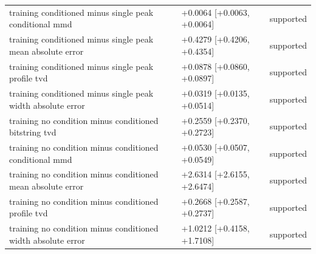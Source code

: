 \begin{table}[p]
\begin{tabular}{@{}p{}p{}p{}@{}}
training conditioned minus single peak conditional mmd & +0.0064 [+0.0063, +0.0064] & supported \\
training conditioned minus single peak mean absolute error & +0.4279 [+0.4206, +0.4354] & supported \\
training conditioned minus single peak profile tvd & +0.0878 [+0.0860, +0.0897] & supported \\
training conditioned minus single peak width absolute error & +0.0319 [+0.0135, +0.0514] & supported \\
training no condition minus conditioned bitstring tvd & +0.2559 [+0.2370, +0.2723] & supported \\
training no condition minus conditioned conditional mmd & +0.0530 [+0.0507, +0.0549] & supported \\
training no condition minus conditioned mean absolute error & +2.6314 [+2.6155, +2.6474] & supported \\
training no condition minus conditioned profile tvd & +0.2668 [+0.2587, +0.2737] & supported \\
training no condition minus conditioned width absolute error & +1.0212 [+0.4158, +1.7108] & supported \\
\bottomrule
\end{tabular}
\end{table}
\clearpage
